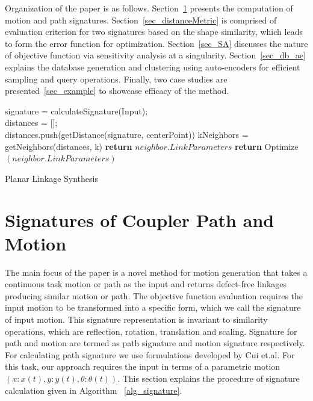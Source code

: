 \documentclass[twocolumn,10pt]{asme2e}
\begin{document}
Organization of the paper is as follows. Section~\ref{sec_sign} presents the computation of motion and path signatures.
Section~\ref{sec_distanceMetric} is comprised of evaluation criterion for two signatures based on the shape similarity, which leads to form the error function for optimization.
Section~\ref{sec_SA} discusses the nature of objective function via sensitivity analysis at a singularity.
Section~\ref{sec_db_ae} explains the database generation and clustering using auto-encoders for efficient sampling and query operations.
Finally, two case studies are presented~\ref{sec_example} to showcase efficacy of the method.

\begin{algorithm}
    signature = calculateSignature(Input); \\
    distances = [];\\
    {
      distances.push(getDistance(signature, centerPoint))
    }
    kNeighbors = getNeighbors(distances, k)
    {
      {
        \textbf{return} $neighbor.LinkParameters$
      }
      {
        \textbf{return} Optimize$(neighbor.LinkParameters)$
      }
    }
    \caption{Planar Linkage Synthesis}
    \label{alg_overall}
\end{algorithm}

\section{Signatures of Coupler Path and Motion}\label{sec_sign}
The main focus of the paper is a novel method for motion generation that takes a continuous task motion or path as the input and returns defect-free linkages producing similar motion or path.
The objective function evaluation requires the input motion to be transformed into a specific form, which we call the signature of input motion.
This signature representation is invariant to similarity operations, which are reflection, rotation, translation and scaling.
Signature for path and motion are termed as path signature and motion signature respectively.
For calculating path signature we use formulations developed by Cui et.al\cite{cui2009}.
For this task, our approach requires the input in terms of a parametric motion $(x:x(t), y:y(t), \theta:\theta(t))$.
This section explains the procedure of signature calculation given in Algorithm ~\ref{alg_signature}.
\end{document}
